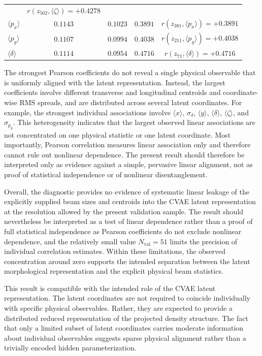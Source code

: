 \begin{table}[htbp]
\begin{tabular}{lcccc}
            & $r(z_{502},\langle\zeta\rangle)=+0.4278$ \\
        $\langle p_x\rangle$
            & $0.1143$ & $0.1023$ & $0.3891$
            & $r(z_{381},\langle p_x\rangle)=+0.3891$ \\
        $\langle p_y\rangle$
            & $0.1107$ & $0.0994$ & $0.4038$
            & $r(z_{211},\langle p_y\rangle)=+0.4038$ \\
        $\langle\delta\rangle$
            & $0.1114$ & $0.0954$ & $0.4716$
            & $r(z_{71},\langle\delta\rangle)=+0.4716$ \\
        \bottomrule
    \end{tabular}
\end{table}

The strongest Pearson coefficients do not reveal a single physical observable that is uniformly aligned with the latent representation. Instead, the largest coefficients involve different transverse and longitudinal centroids and coordinate-wise RMS spreads, and are distributed across several latent coordinates. For example, the strongest individual associations involve $\langle x\rangle$, $\sigma_\delta$, $\langle y\rangle$, $\langle\delta\rangle$, $\langle\zeta\rangle$, and $\sigma_{p_y}$. This heterogeneity indicates that the largest observed linear associations are not concentrated on one physical statistic or one latent coordinate. Most importantly, Pearson correlation measures linear association only and therefore cannot rule out nonlinear dependence. The present result should therefore be interpreted only as evidence against a simple, pervasive linear alignment, not as proof of statistical independence or of nonlinear disentanglement.

Overall, the diagnostic provides no evidence of systematic linear leakage of the explicitly supplied beam sizes and centroids into the CVAE latent representation at the resolution allowed by the present validation sample. The result should nevertheless be interpreted as a test of linear dependence rather than a proof of full statistical independence as Pearson coefficients do not exclude nonlinear dependence, and the relatively small value
$N_{\mathrm{val}}=51$ limits the precision of individual correlation estimates. Within these limitations, the observed concentration around zero supports the intended separation between the latent morphological representation and the explicit physical beam statistics.

This result is compatible with the intended role of the CVAE latent representation. The latent coordinates are not required to coincide individually with specific physical observables. Rather, they are expected to provide a distributed reduced representation of the projected density structure. The fact that only a limited subset of latent coordinates carries moderate information about individual observables suggests sparse physical alignment rather than a trivially encoded hidden parameterization.

